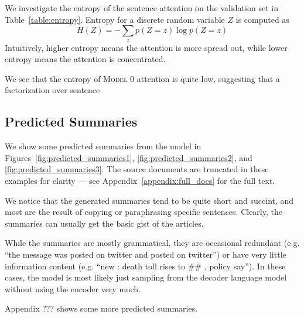 \documentclass[12pt]{report}
\begin{document}
We investigate the entropy of the sentence attention on the validation set in Table~\ref{table:entropy}. Entropy for a discrete random variable $Z$ is computed as
$$H(Z) = -\sum_{z} p(Z = z) \log p(Z = z)$$
Intuitively, higher entropy means the attention is more spread out, while lower entropy means the attention is concentrated.

We see that the entropy of \textsc{Model 0} attention is quite low, suggesting that a factorization over sentence




\subsection{Predicted Summaries}
We show some predicted summaries from the model in Figures~\ref{fig:predicted_summaries1}, \ref{fig:predicted_summaries2}, and \ref{fig:predicted_summaries3}.
The source documents are truncated in these examples for clarity --- see Appendix~\ref{appendix:full_docs} for the full text.

We notice that the generated summaries tend to be quite short and succint, and most are the result of copying or paraphrasing specific sentences. Clearly, the summaries can usually get the basic gist of the articles. 

While the summaries are mostly grammatical, they are occasional redundant (e.g. ``the message was posted on twitter and posted on twitter'') or have very little information content (e.g. ``new : death toll rises to \#\# , policy say''). In these cases, the model is most likely just sampling from the decoder language model without using the encoder very much.

Appendix ??? shows some more predicted summaries.
\end{document}
